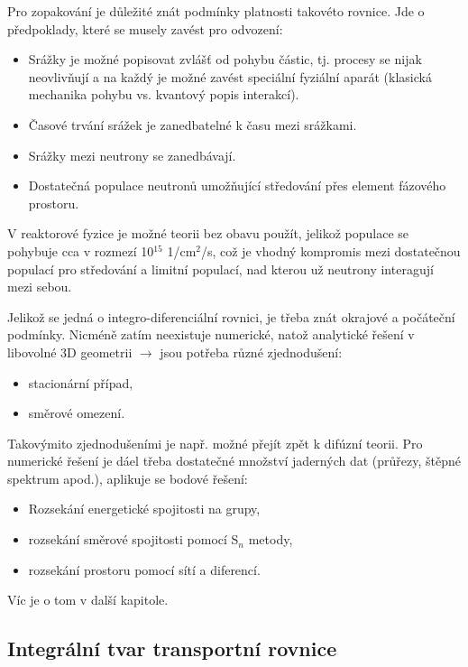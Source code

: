Pro zopakování je důležité znát podmínky platnosti takovéto rovnice. Jde o předpoklady, které se musely zavést pro odvození:

\begin{itemize}
  \item Srážky je možné popisovat zvlášť od pohybu částic, tj. procesy se nijak neovlivňují a na každý je možné zavést speciální fyziální aparát (klasická mechanika pohybu vs. kvantový popis interakcí).
  \item Časové trvání srážek je zanedbatelné k času mezi srážkami.
  \item Srážky mezi neutrony se zanedbávají.
  \item Dostatečná populace neutronů umožňující středování přes element fázového prostoru.
\end{itemize}

V reaktorové fyzice je možné teorii bez obavu použít, jelikož populace se pohybuje cca v rozmezí 10$^{15}$ 1/cm$^2$/s, což je vhodný kompromis mezi dostatečnou populací pro středování a limitní populací, nad kterou už neutrony interagují mezi sebou.

Jelikož se jedná o integro-diferenciální rovnici, je třeba znát okrajové a počáteční podmínky. Nicméně zatím neexistuje numerické, natož analytické řešení v libovolné 3D geometrii $\rightarrow$ jsou potřeba různé zjednodušení:

\begin{itemize}
  \item stacionární případ,
  \item směrové omezení.
\end{itemize}

Takovýmito zjednodušeními je např. možné přejít zpět k difúzní teorii. Pro numerické řešení je dáel třeba dostatečné množství jaderných dat (průřezy, štěpné spektrum apod.), aplikuje se bodové řešení:

\begin{itemize}
  \item Rozsekání energetické spojitosti na grupy,
  \item rozsekání směrové spojitosti pomocí S$_n$ metody,
  \item rozsekání prostoru pomocí sítí a diferencí.
\end{itemize}

Víc je o tom v další kapitole.

\subsection{Integrální tvar transportní rovnice}


